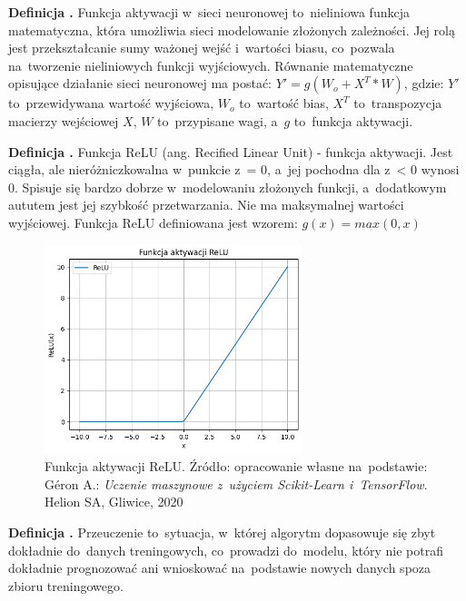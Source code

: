 \noindent
\textbf{Definicja .}
\incrementdefinitionIndex
Funkcja aktywacji w~sieci neuronowej to~nieliniowa funkcja matematyczna,
która umożliwia sieci modelowanie złożonych zależności.
Jej rolą jest przekształcanie sumy ważonej wejść i~wartości biasu,
co~pozwala na~tworzenie nieliniowych funkcji wyjściowych.
Równanie matematyczne opisujące działanie sieci neuronowej ma postać: $Y' = g(W_o + X^T * W)$, gdzie:
$Y'$ to~przewidywana wartość wyjściowa,
$W_o$ to~wartość bias,
$X^T$ to~transpozycja macierzy wejściowej $X$,
$W$ to~przypisane wagi,
a~$g$ to~funkcja aktywacji.

\noindent
\textbf{Definicja .}
\incrementdefinitionIndex
Funkcja ReLU (ang. Recified Linear Unit) - funkcja aktywacji.
Jest ciągła, ale nieróżniczkowalna w~punkcie z~= 0, a~jej pochodna dla z~< 0 wynosi 0.
Spisuje się bardzo dobrze w~modelowaniu złożonych funkcji, a~dodatkowym aututem jest jej szybkość przetwarzania.
Nie ma maksymalnej wartości wyjściowej.
Funkcja ReLU definiowana jest wzorem:
$g(x) = max(0, x)$

\begin{figure}[ht]
	\centering
	\includegraphics[width=7.5cm]{resources/machine-learning/images/def_relu.png}
	\caption{Funkcja aktywacji ReLU.
		Źródło: opracowanie własne na~podstawie:
        Géron A.: \textit{Uczenie maszynowe z~użyciem Scikit-Learn i~TensorFlow}. Helion SA, Gliwice, 2020}
    \label{Fig:def-1}
\end{figure}
\FloatBarrier

\noindent
\textbf{Definicja .}
\incrementdefinitionIndex
Przeuczenie to~sytuacja, w~której algorytm dopasowuje się zbyt dokładnie do~danych treningowych,
co~prowadzi do~modelu, który nie potrafi dokładnie prognozować ani wnioskować na~podstawie nowych danych spoza zbioru treningowego.

